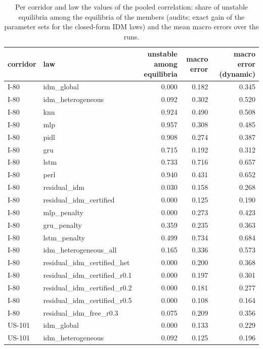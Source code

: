 \begin{table}[htbp]
\centering
\caption{Per corridor and law the values of the pooled correlation: share of unstable equilibria among the equilibria of the members (audits; exact gain of the parameter sets for the closed-form IDM laws) and the mean macro errors over the runs.}
\label{tab:correlation-pooled-laws}
\small
\begin{tabular}{llrrr}
\toprule
corridor & law & unstable among equilibria & macro error & macro error (dynamic) \\
\midrule
I-80 & idm\_global & 0.000 & 0.182 & 0.345 \\
I-80 & idm\_heterogeneous & 0.092 & 0.302 & 0.520 \\
I-80 & knn & 0.924 & 0.490 & 0.508 \\
I-80 & mlp & 0.957 & 0.308 & 0.485 \\
I-80 & pidl & 0.908 & 0.274 & 0.387 \\
I-80 & gru & 0.715 & 0.192 & 0.312 \\
I-80 & lstm & 0.733 & 0.716 & 0.657 \\
I-80 & perl & 0.940 & 0.431 & 0.652 \\
I-80 & residual\_idm & 0.030 & 0.158 & 0.268 \\
I-80 & residual\_idm\_certified & 0.000 & 0.125 & 0.190 \\
I-80 & mlp\_penalty & 0.000 & 0.273 & 0.423 \\
I-80 & gru\_penalty & 0.359 & 0.235 & 0.363 \\
I-80 & lstm\_penalty & 0.499 & 0.734 & 0.684 \\
I-80 & idm\_heterogeneous\_all & 0.165 & 0.336 & 0.573 \\
I-80 & residual\_idm\_certified\_het & 0.000 & 0.200 & 0.368 \\
I-80 & residual\_idm\_certified\_r0.1 & 0.000 & 0.197 & 0.301 \\
I-80 & residual\_idm\_certified\_r0.2 & 0.000 & 0.181 & 0.277 \\
I-80 & residual\_idm\_certified\_r0.5 & 0.000 & 0.108 & 0.164 \\
I-80 & residual\_idm\_free\_r0.3 & 0.075 & 0.209 & 0.356 \\
US-101 & idm\_global & 0.000 & 0.133 & 0.229 \\
US-101 & idm\_heterogeneous & 0.092 & 0.125 & 0.196 \\

\end{tabular}
\end{table}
